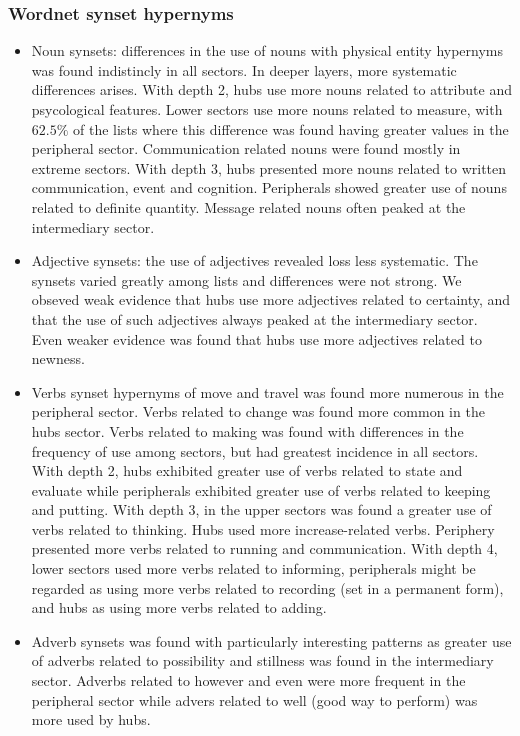\subsubsection{Wordnet synset hypernyms}\label{subsec:wn1}
\begin{itemize}
	\item Noun synsets: differences in the use of nouns with physical entity hypernyms was found indistincly in all sectors.
		In deeper layers, more systematic differences arises.
		With depth 2, hubs use more nouns related to attribute and psycological features.
		Lower sectors use more nouns related to measure,
		with $62.5\%$ of the lists where this difference was found having greater values in the peripheral sector.
		Communication related nouns were found mostly in extreme sectors.
		With depth 3, hubs presented more nouns related to written communication, event and cognition.
		Peripherals showed greater use of nouns related to definite quantity.
		Message related nouns often peaked at the intermediary sector.
	\item Adjective synsets: the use of adjectives revealed loss less systematic.
		The synsets varied greatly among lists and differences were not strong.
		We obseved weak evidence that hubs use more adjectives related to certainty,
		and that the use of such adjectives always peaked at the intermediary sector.
		Even weaker evidence was found that hubs use more adjectives related to newness.
	\item Verbs synset hypernyms of move and travel was found more numerous in the peripheral sector.
		Verbs related to change was found more common in the hubs sector.
		Verbs related to making was found with differences in the frequency of use among sectors,
		but had greatest incidence in all sectors.
		With depth 2, hubs exhibited greater use of verbs related to state and evaluate while
		peripherals exhibited greater use of verbs related to keeping and putting.
		With depth 3, in the upper sectors was found a greater use of verbs related to thinking.
		Hubs used more increase-related verbs.
		Periphery presented more verbs related to running and communication.
		With depth 4, lower sectors used more verbs related to informing, peripherals might be regarded as using more verbs related to recording (set in a permanent form), and hubs as using more verbs related to adding.
	\item Adverb synsets was found with particularly interesting patterns as greater use of adverbs related to possibility and stillness was found in the intermediary sector.
		Adverbs related to however and even were more frequent in the peripheral sector while advers related to well (good way to perform) was more used by hubs.
\end{itemize}

